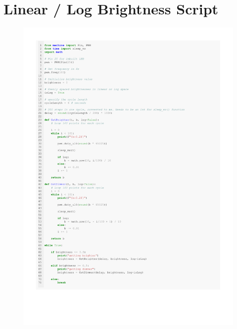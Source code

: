 \documentclass[%
 reprint,
 amsmath,amssymb,
 aps,
]{revtex4-2}
\begin{document}
\section{Linear / Log Brightness Script}
    \begin{figure}[h]
        \includegraphics[width=\columnwidth]{Images/linearLogBrightness.pdf}
    \end{figure}

\clearpage
\end{document}
